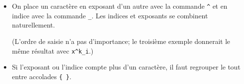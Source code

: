 \begin{itemize}
\item On place un caractère en exposant d'un autre avec la commande
  \verb=^= et en indice avec la commande \verb=_=. Les indices et
  exposants se combinent naturellement.
  (L'ordre de saisie n'a pas d'importance; le troisième exemple
  donnerait le même résultat avec \verb=x^k_i=.)
\item Si l'exposant ou l'indice compte plus d'un caractère, il faut
  regrouper le tout entre accolades \verb={ }=.
\end{itemize}

